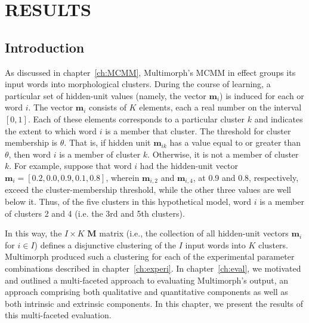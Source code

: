\chapter{RESULTS}
\label{ch:results}


\section{Introduction}

As discussed in chapter~\ref{ch:MCMM}, Multimorph's \ac{MCMM} 
in effect groups its input words into morphological clusters. 
During the course of learning, a particular set of hidden-unit values 
(namely, the vector $\mathbf{m}_{i}$) is induced for each or word $i$. 
The vector $\mathbf{m}_{i}$ consists of $K$ elements, each a real number on the interval $[0,1]$. 
Each of these elements corresponds to a particular cluster $k$ and indicates 
the extent to which word $i$ is a member that cluster.
The threshold for cluster membership is $\theta$. That is, if hidden unit 
$\mathbf{m}_{ik}$ has a value equal to or greater than 
$\theta$, then word $i$ is a member of cluster $k$. Otherwise, it is not a member of cluster $k$. 
For example, suppose that word $i$ had the hidden-unit vector $\mathbf{m}_{i} = [0.2, 0.0,0.9,0.1,0.8]$, 
wherein $\mathbf{m}_{i,2}$ and $\mathbf{m}_{i,4}$, at 0.9 and 0.8, respectively, exceed the cluster-membership 
threshold, while the other three values
are well below it. Thus, of the five clusters in this hypothetical model, word $i$ is a member of clusters 
2 and 4 (i.e. the 3rd and 5th clusters).

In this way, the $I \times K$ $\mathbf{M}$ matrix (i.e., the collection of all hidden-unit vectors $\mathbf{m}_i$ for $i \in I$) 
defines a disjunctive clustering of the $I$ input words into $K$ clusters. Multimorph produced such a clustering for 
each of the experimental parameter combinations described in chapter~\ref{ch:experi}. In chapter~\ref{ch:eval}, 
we motivated and outlined a multi-faceted approach to evaluating Multimorph's output, an approach comprising 
both qualitative and quantitative components as well as both intrinsic and extrinsic components. 
In this chapter, we present the results of this multi-faceted evaluation. 

